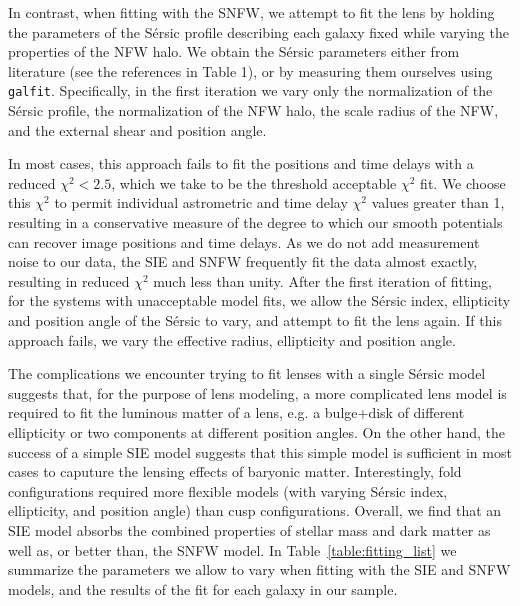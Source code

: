 In contrast, when fitting with the SNFW, we attempt to fit the lens by holding the parameters of the S{\'e}rsic profile describing each galaxy fixed while varying the properties of the NFW halo. We obtain the S{\'e}rsic parameters either from literature (see the references in Table 1), or by measuring them ourselves using {\tt {galfit}}. Specifically, in the first iteration we vary only the normalization of the S{\'e}rsic profile, the normalization of the NFW halo, the scale radius of the NFW, and the external shear and position angle. 

In most cases, this approach fails to fit the positions and time delays with a reduced $\chi^2 < 2.5$, which we take to be the threshold acceptable $\chi^2$ fit. We choose this $\chi^2$ to permit individual astrometric and time delay $\chi^2$ values greater than 1, resulting in a conservative measure of the degree to which our smooth potentials can recover image positions and time delays. As we do not add measurement noise to our data, the SIE and SNFW frequently fit the data almost exactly, resulting in reduced $\chi^2$ much less than unity. After the first iteration of fitting, for the systems with unacceptable model fits, we allow the S{\'e}rsic index, ellipticity and position angle of the S{\'e}rsic to vary, and attempt to fit the lens again. If this approach fails, we vary the effective radius, ellipticity and position angle. 

The complications we encounter trying to fit lenses with a single S{\'e}rsic model suggests that, for the purpose of lens modeling, a more complicated lens model is required to fit the luminous matter of a lens, e.g. a bulge+disk of different ellipticity or two components at different position angles. On the other hand, the success of a simple SIE model suggests that this simple model is sufficient in most cases to caputure the lensing effects of baryonic matter. Interestingly, fold configurations required more flexible models (with varying S{\'e}rsic index, ellipticity, and position angle) than cusp configurations. Overall, we find that an SIE model absorbs the combined properties of stellar mass and dark matter as well as, or better than, the SNFW model. In Table~\ref{table:fitting_list} we summarize the parameters we allow to vary when fitting with the SIE and SNFW models, and the results of the fit for each galaxy in our sample.
